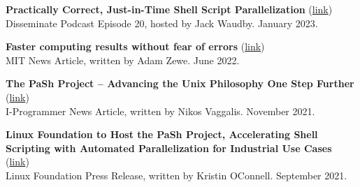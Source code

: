 \documentclass[margin]{res}
\begin{document}
\begin{resume}
\textbf{Practically Correct, Just-in-Time Shell Script Parallelization} (\href{https://disseminatepodcast.podcastpage.io/episode/konstantinos-kallas-practically-correct-just-in-time-shell-script-parallelization-20}{link}) \\
Disseminate Podcast Episode 20, hosted by Jack Waudby. January 2023.

\textbf{Faster computing results without fear of errors} (\href{https://news.mit.edu/2022/faster-unix-computing-program-0607}{link}) \\
MIT News Article, written by Adam Zewe. June 2022.

\textbf{The PaSh Project -- Advancing the Unix Philosophy One Step Further} (\href{https://www.i-programmer.info/news/90-tools/14990-the-pash-project-advancing-the-unix-philosophy-one-step-further.html}{link}) \\
I-Programmer News Article, written by Nikos Vaggalis. November 2021.

\textbf{Linux Foundation to Host the PaSh Project, Accelerating Shell Scripting with Automated Parallelization for Industrial Use Cases} (\href{https://www.linuxfoundation.org/press/press-release/linux-foundation-to-host-the-pash-project-accelerating-shell-scripting-with-automated-parallelization-for-industrial-use-cases}{link}) \\
Linux Foundation Press Release, written by Kristin OConnell. September 2021.









\end{resume}
\end{document}
